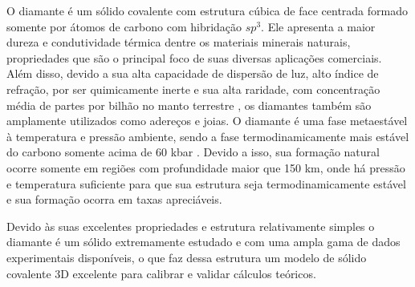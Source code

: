 		O diamante é um sólido covalente com estrutura cúbica de face centrada formado somente por átomos de carbono com hibridação $sp^3$. Ele apresenta a maior dureza e condutividade térmica dentre os materiais minerais naturais, propriedades que são o principal foco de suas diversas aplicações comerciais. Além disso, devido a sua alta capacidade de dispersão de luz, alto índice de refração, por ser quimicamente inerte e sua alta raridade, com concentração média de partes por bilhão no manto terrestre \cite{cartigny2014diamond}, os diamantes também são amplamente utilizados como adereços e joias. O diamante é uma fase metaestável à temperatura e pressão ambiente, sendo a fase termodinamicamente mais estável do carbono somente acima de 60 kbar \cite{pierson2012handbook}. Devido a isso, sua formação natural ocorre somente em regiões com profundidade maior que 150 km, onde há pressão e temperatura suficiente para que sua estrutura seja termodinamicamente estável e sua formação ocorra em taxas apreciáveis. 
		
		Devido às suas excelentes propriedades e estrutura relativamente simples o diamante é um sólido extremamente estudado e com uma ampla gama de dados experimentais disponíveis, o que faz dessa estrutura um modelo de sólido covalente 3D excelente para calibrar e validar cálculos teóricos. 
		

